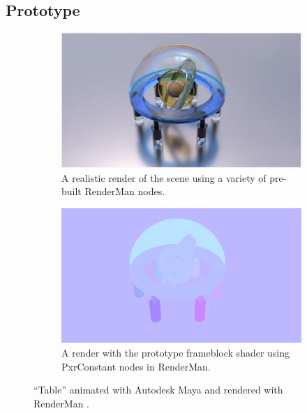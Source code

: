 \documentclass[conference]{IEEEtran}
\begin{document}
\subsection{Prototype}
\begin{figure}[htbp]
\centering
\begin{subfigure}{.45\textwidth}
  \centering
  \includegraphics[width=\linewidth]{table.png}
  \caption{A realistic render of the scene using a variety of pre-built RenderMan nodes.}
  \label{fig:table}
\end{subfigure}
\par\bigskip
\begin{subfigure}{.45\textwidth}
  \centering
  \includegraphics[width=\linewidth]{prototype_render.png}
  \caption{A render with the prototype frameblock shader using PxrConstant nodes in RenderMan.}
  \label{fig:prototype}
\end{subfigure}
\caption{``Table'' animated with Autodesk Maya and rendered with RenderMan \cite{animation}.}
\label{fig:render}
\end{figure}
\end{document}

